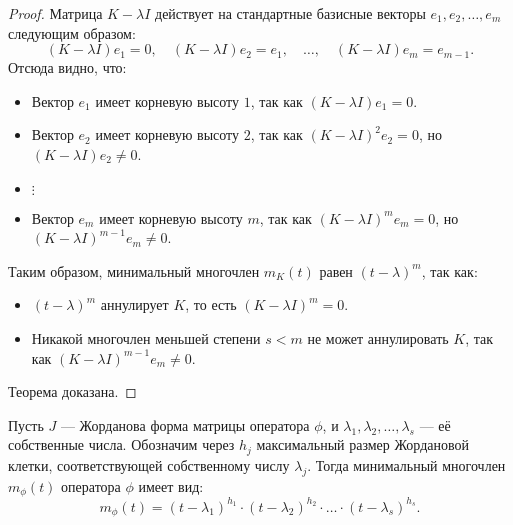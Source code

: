 \begin{proof}
Матрица \( K - \lambda I \) действует на стандартные базисные векторы \( e_1, e_2, \ldots, e_m \) следующим образом:
\[
(K - \lambda I) e_1 = 0, \quad (K - \lambda I) e_2 = e_1, \quad \ldots, \quad (K - \lambda I) e_m = e_{m-1}.
\]
Отсюда видно, что:
\begin{itemize}
    \item Вектор \( e_1 \) имеет корневую высоту \( 1 \), так как \( (K - \lambda I) e_1 = 0 \).
    \item Вектор \( e_2 \) имеет корневую высоту \( 2 \), так как \( (K - \lambda I)^2 e_2 = 0 \), но \( (K - \lambda I) e_2 \neq 0 \).
    \item \(\vdots\)
    \item Вектор \( e_m \) имеет корневую высоту \( m \), так как \( (K - \lambda I)^m e_m = 0 \), но \\\( (K - \lambda I)^{m-1} e_m \neq 0 \).
\end{itemize}

Таким образом, минимальный многочлен \( m_K(t) \) равен \( (t - \lambda)^m \), так как:
\begin{itemize}
    \item \( (t - \lambda)^m \) аннулирует \( K \), то есть \( (K - \lambda I)^m = 0 \).
    \item Никакой многочлен меньшей степени \( s < m \) не может аннулировать \( K \), так как \( (K - \lambda I)^{m-1} e_m \neq 0 \).
\end{itemize}

Теорема доказана.
\end{proof}

\begin{shth}
    \begin{theorem}
    Пусть \( J \) — Жорданова форма матрицы оператора \(\phi\), и \(\lambda_1, \lambda_2, \ldots, \lambda_s\) — её собственные числа. Обозначим через \( h_j \) максимальный размер Жордановой клетки, соответствующей собственному числу \(\lambda_j\). Тогда минимальный многочлен \( m_{\phi}(t) \) оператора \(\phi\) имеет вид:
    \[
    m_{\phi}(t) = (t - \lambda_1)^{h_1} \cdot (t - \lambda_2)^{h_2} \cdot \ldots \cdot (t - \lambda_s)^{h_s}.
    \]
    \end{theorem}
\end{shth}

